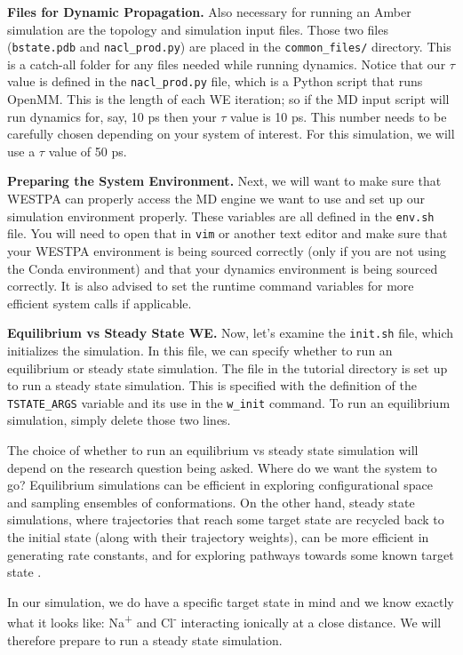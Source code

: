 \documentclass[9pt,tutorial,pubversion]{livecoms}
\begin{document}
\textbf{Files for Dynamic Propagation.} Also necessary for running an Amber simulation are the topology and simulation input files. 
Those two files (\verb|bstate.pdb| and \verb|nacl_prod.py|) are placed in the \verb|common_files/| directory. 
This is a catch-all folder for any files needed while running dynamics. 
Notice that our $\tau$ value is defined in the \verb|nacl_prod.py| file, which is a Python script that runs OpenMM.  
This is the length of each WE iteration; so if the MD input script will run dynamics for, say, 10 ps then your $\tau$ value is 10 ps. 
This number needs to be carefully chosen depending on your system of interest. 
For this simulation, we will use a $\tau$ value of 50 ps. 

\textbf{Preparing the System Environment.} Next, we will want to make sure that WESTPA can properly access the MD engine we want to use and set up our simulation environment properly. 
These variables are all defined in the \verb|env.sh| file. 
You will need to open that in \verb|vim| or another text editor and make sure that your WESTPA environment is being sourced correctly (only if you are not using the Conda environment) and that your dynamics environment is being sourced correctly. 
It is also advised to set the runtime command variables for more efficient system calls if applicable.

\textbf{Equilibrium vs Steady State WE.} Now, let’s examine the \verb|init.sh| file, which initializes the simulation. 
In this file, we can specify whether to run an equilibrium or steady state simulation. 
The file in the tutorial directory is set up to run a steady state simulation. 
This is specified with the definition of the \verb|TSTATE_ARGS| variable and its use in the \verb|w_init| command. 
To run an equilibrium simulation, simply delete those two lines.

The choice of whether to run an equilibrium vs steady state simulation will depend on the research question being asked. 
Where do we want the system to go?  
Equilibrium simulations can be efficient in exploring configurational space and sampling ensembles of conformations. 
On the other hand, steady state simulations, where trajectories that reach some target state are recycled back to the initial state (along with their trajectory weights), can be more efficient in generating rate constants, and for exploring pathways towards some known target state \citep{Pratt2019}. 

In our simulation, we do have a specific target state in mind and we know exactly what it looks like: Na\textsuperscript{+} and Cl\textsuperscript{-} interacting ionically at a close distance. 
We will therefore prepare to run a steady state simulation. 
\end{document}
